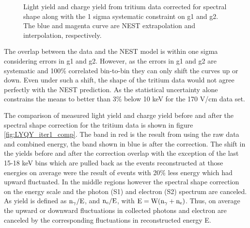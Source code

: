 \begin{figure}[p!]
\caption{Light yield and charge yield from tritium data corrected for spectral shape along with the 1 sigma systematic constraint on g1 and g2. The blue and magenta curve are NEST extrapolation and interpolation, respectively.}
\label{fig:LYQY_iter1}
\end{figure}
\renewcommand{\baselinestretch}{2}
\small\normalsize


The overlap between the data and the NEST model is within one sigma considering errors in g1 and g2. However, as the errors in g1 and g2 are systematic and 100\% correlated bin-to-bin they can only shift the curves up or down. Even under such a shift, the shape of the tritium data would not agree perfectly with the NEST prediction. As the statistical uncertainty alone constrains the means to better than 3\% below 10 keV for the 170 V/cm data set. 


The comparison of measured light yield and charge yield before and after the spectral shape correction for the tritium data is shown in figure \ref{fig:LYQY_iter1_comp}. The band in red is the result from using the raw data and combined energy, the band shown in blue is after the correction. The shift in the yields before and after the correction overlap with the exception of the last 15-18 keV bins which are pulled back as the events reconstructed at those energies on average were the result of events with 20\% less energy which had upward fluctuated. In the middle regions however the spectral shape correction on the energy scale and the photon (S1) and electron (S2) spectrum are canceled. As yield is defined as $\rm n_\gamma/E $, and $\rm n_e/E$, with $\rm E=W(n_\gamma + n_e)$. Thus, on average the upward or downward fluctuations in collected photons and electron are canceled by the corresponding fluctuations in reconstructed energy E.

